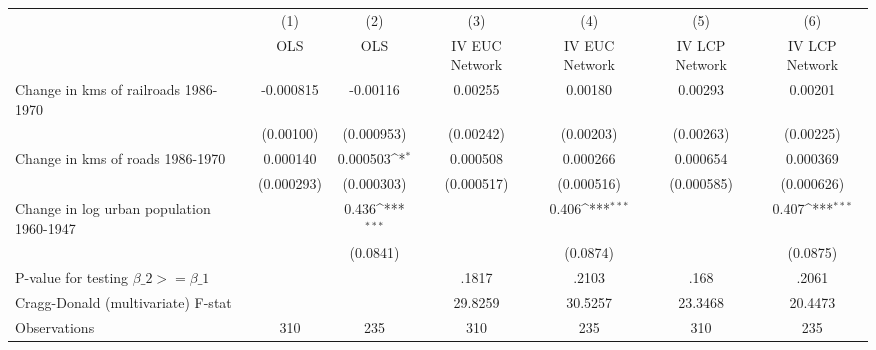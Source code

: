 {
\def\sym#1{\ifmmode^{#1}\else\(^{#1}\)\fi}
\begin{tabular}{l*{6}{c}}
\hline\hline
                &\multicolumn{1}{c}{(1)}&\multicolumn{1}{c}{(2)}&\multicolumn{1}{c}{(3)}&\multicolumn{1}{c}{(4)}&\multicolumn{1}{c}{(5)}&\multicolumn{1}{c}{(6)}\\
                &\multicolumn{1}{c}{OLS}&\multicolumn{1}{c}{OLS}&\multicolumn{1}{c}{IV EUC Network}&\multicolumn{1}{c}{IV EUC Network}&\multicolumn{1}{c}{IV LCP Network}&\multicolumn{1}{c}{IV LCP Network}\\
\hline
Change in kms of railroads 1986-1970&-0.000815         & -0.00116         &  0.00255         &  0.00180         &  0.00293         &  0.00201         \\
                &(0.00100)         &(0.000953)         &(0.00242)         &(0.00203)         &(0.00263)         &(0.00225)         \\
[1em]
Change in kms of roads 1986-1970& 0.000140         & 0.000503\sym{*}  & 0.000508         & 0.000266         & 0.000654         & 0.000369         \\
                &(0.000293)         &(0.000303)         &(0.000517)         &(0.000516)         &(0.000585)         &(0.000626)         \\
[1em]
Change in log urban population 1960-1947&                  &    0.436\sym{***}&                  &    0.406\sym{***}&                  &    0.407\sym{***}\\
                &                  & (0.0841)         &                  & (0.0874)         &                  & (0.0875)         \\
\hline
P-value for testing $\beta\_{2} >= \beta\_{1}$&                  &                  &    .1817         &    .2103         &     .168         &    .2061         \\
Cragg-Donald (multivariate) F-stat&                  &                  &  29.8259         &  30.5257         &  23.3468         &  20.4473         \\
Observations    &      310         &      235         &      310         &      235         &      310         &      235         \\
\hline\hline
\end{tabular}
}
